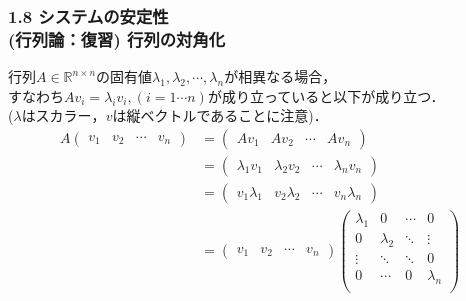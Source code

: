 \documentclass[10pt]{beamer}
\begin{document}
\begin{frame}[t]
\frametitle{1.8 システムの安定性 \\
(行列論：復習) 行列の対角化}
行列$A \in {\mathbb R}^{n \times n}$の固有値$\lambda_1, \lambda_2,
\cdots, \lambda_n$が相異なる場合，\\
すなわち$A v_i = \lambda_i v_i, (i = 1 \cdots n)$が成り立っていると以下が成り立つ．\\
($\lambda$はスカラー，$v$は縦ベクトルであることに注意)．
\begin{align}
 A
 \left(
 \begin{array}{cccc}
  v_1 & v_2 & \cdots & v_n
 \end{array}
 \right)
 &=
 \left(
 \begin{array}{cccc}
  Av_1 & Av_2 & \cdots & Av_n
 \end{array}
 \right) \\
 &=
 \left(
 \begin{array}{cccc}
  \lambda_1 v_1 & \lambda_2 v_2 & \cdots & \lambda_n v_n
 \end{array}
 \right) \nonumber \\
 &=
 \left(
 \begin{array}{cccc}
  v_1 \lambda_1 & v_2 \lambda_2 & \cdots & v_n \lambda_n
 \end{array}
 \right) \nonumber \\
 &=
 \left(
 \begin{array}{cccc}
  v_1 & v_2 & \cdots & v_n
 \end{array}
 \right)
 \left(
 \begin{array}{cccc}
  \lambda_1 & 0         & \cdots & 0 \\
   0        & \lambda_2 & \ddots & \vdots \\
   \vdots   & \ddots    & \ddots & 0 \\
   0        & \cdots    & 0      & \lambda_n \\
 \end{array}
 \right)
\end{align}
\end{frame}
\end{document}
